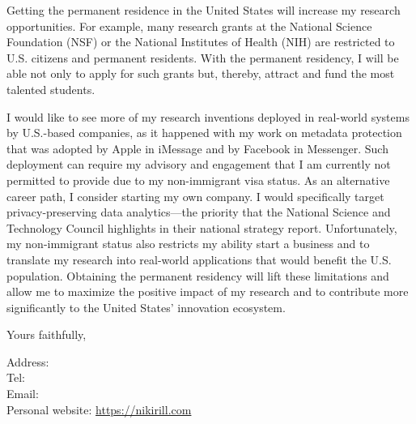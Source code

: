 Getting the permanent residence in the United States will increase my research
opportunities. For example, many research grants at the National Science
Foundation (NSF) or the National Institutes of Health (NIH) are restricted to
U.S. citizens and permanent residents.
With the permanent residency, I will be able not only to apply for such grants
but, thereby, attract and fund the most talented students.

I would like to see more of my research inventions deployed in real-world
systems by U.S.-based companies, as it happened with my work on metadata
protection that was adopted by Apple in iMessage and by Facebook in Messenger.
Such deployment can require my advisory and engagement that I am 
currently not permitted to provide due to my non-immigrant visa status.
As an alternative career path, I consider starting my own company.
I would specifically target privacy-preserving data analytics---the priority
that the National Science and Technology Council highlights in their national
strategy report.
Unfortunately, my non-immigrant status also restricts my ability start a
business and to translate my research into real-world applications that would
benefit the U.S. population.
Obtaining the permanent residency will lift these limitations and allow me to
maximize the positive impact of my research and to contribute more significantly
to the United States' innovation ecosystem.


Yours faithfully,

\vspace{5em}
\drfull

Address: \\
Tel: \\
Email: \\
Personal website: \url{https://nikirill.com}

\pagebreak